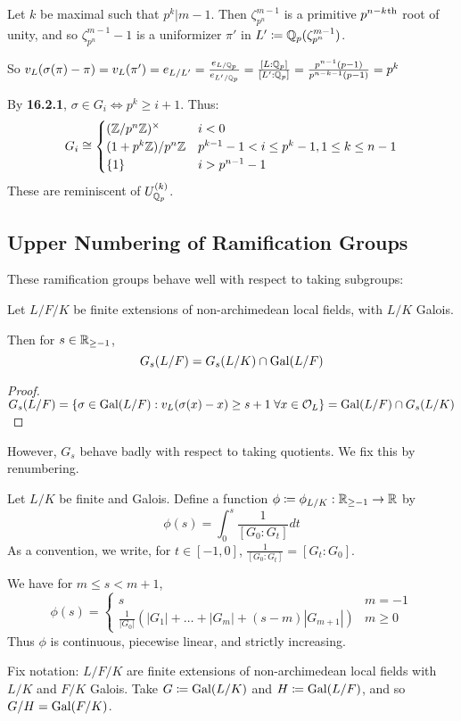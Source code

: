\documentclass[10pt,a4paper]{article}
\begin{document}
Let $k$ be maximal such that $p^k | m-1$. Then $\zeta_{p^n}^{m-1}$ is a primitive $p^{n-k}\textsuperscript{th}$ root of unity, and so $\zeta_{p^n}^{m-1}-1$ is a uniformizer $\pi'$ in $L'\coloneqq \mathbb{Q}_p(\zeta_{p^n}^{m-1})$.

So $v_L(\sigma(\pi)-\pi) = v_L(\pi') = e_{L/L'} = \frac{e_{L/\mathbb{Q}_p}}{e_{L'/\mathbb{Q}_p}} = \frac{[L:\mathbb{Q}_p]}{[L':\mathbb{Q}_p]} = \frac{p^{n-1}(p-1)}{p^{n-k-1}(p-1)} = p^k$

By \textbf{16.2.1}, $\sigma \in G_i \iff p^k\geq i+1$. Thus:
\[G_i \cong \begin{cases} (\mathbb{Z}/p^n\mathbb{Z})^\times & i < 0 \\ (1+p^k\mathbb{Z})/p^n\mathbb{Z} & p^{k-1}-1<i\leq p^{k}-1, 1\leq k\leq n-1\\ \{1\} & i > p^{n-1}-1\end{cases}\]
These are reminiscent of $U_{\mathbb{Q}_p}^{(k)}$.

\subsection{Upper Numbering of Ramification Groups}
These ramification groups behave well with respect to taking subgroups:
\begin{proposition}
  Let $L/F/K$ be finite extensions of non-archimedean local fields, with $L/K$ Galois.

  Then for $s \in \mathbb{R}_{\geq-1}$,
  \[G_s(L/F) = G_s(L/K)\cap \operatorname{Gal}(L/F)\]
\end{proposition}
\begin{proof}
  $G_s(L/F) = \{\sigma \in \Gal(L/F) : v_L(\sigma(x)-x) \geq s+1 \forall x \in \O_L\} = \Gal(L/F) \cap G_s(L/K)$
\end{proof}
However, $G_s$ behave badly with respect to taking quotients. We fix this by renumbering.

Let $L/K$ be finite and Galois. Define a function $\phi \coloneqq \phi_{L/K}:\mathbb{R}_{\geq -1}\to \mathbb{R}$ by
\[\phi(s) = \int_0^s \frac{1}{[G_0:G_t]}dt\]
As a convention, we write, for $t\in [-1, 0]$, $\frac{1}{[G_0:G_t]} = [G_t:G_0]$.

We have for $m \leq s < m+1$,
\[\phi(s) = \begin{cases} s & m = -1\\\frac{1}{|G_0|}(|G_1|+\ldots+|G_m|+(s-m)|G_{m+1}|) & m \geq 0\end{cases}\]
Thus $\phi$ is continuous, piecewise linear, and strictly increasing.

Fix notation: $L/F/K$ are finite extensions of non-archimedean local fields with $L/K$ and $F/K$ Galois. Take $G \coloneqq \operatorname{Gal}(L/K)$ and $H \coloneqq \operatorname{Gal}(L/F)$, and so $G/H = \operatorname{Gal}(F/K)$.
\end{document}
